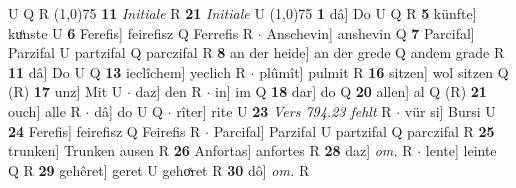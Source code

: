 \documentclass[8pt,a4paper,notitlepage]{article}
\begin{document}
\begin{table}[ht]
\begin{minipage}[t]{0.5\linewidth}
U Q R \newline
\line(1,0){75} \newline
\textbf{11} \textit{Initiale} R  \textbf{21} \textit{Initiale} U  \newline
\line(1,0){75} \newline
\textbf{1} dâ] Do U Q R \textbf{5} künfte] kuͦnste U \textbf{6} Ferefis] feirefisz Q Ferrefis R  $\cdot$ Anschevin] anshevin Q \textbf{7} Parcifal] Parzifal U partzifal Q parczifal R \textbf{8} an der heide] an der grede Q andem grade R \textbf{11} dâ] Do U Q \textbf{13} ieclîchem] yeclich R  $\cdot$ plûmît] pulmit R \textbf{16} sitzen] wol sitzen Q (R) \textbf{17} unz] Mit U  $\cdot$ daz] den R  $\cdot$ in] im Q \textbf{18} dar] do Q \textbf{20} allen] al Q (R) \textbf{21} ouch] alle R  $\cdot$ dâ] do U Q  $\cdot$ rîter] rite U \textbf{23} \textit{Vers 794.23 fehlt} R   $\cdot$ vür si] Bursi U \textbf{24} Ferefis] feirefisz Q Feirefis R  $\cdot$ Parcifal] Parzifal U partzifal Q parczifal R \textbf{25} trunken] Trunken ausen R \textbf{26} Anfortas] anfortes R \textbf{28} daz] \textit{om.} R  $\cdot$ lente] leinte Q R \textbf{29} gehêret] geret U gehoͯret R \textbf{30} dô] \textit{om.} R \newline
\end{minipage}
\end{table}
\end{document}
